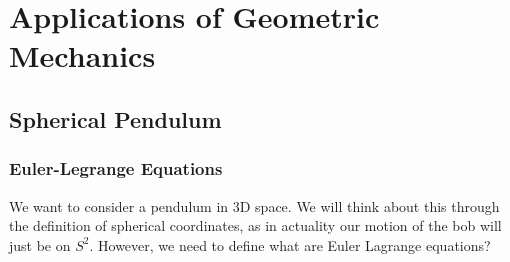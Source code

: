 
\section{Applications of Geometric Mechanics}

\subsection{Spherical Pendulum}

\subsubsection{Euler-Legrange Equations}

We want to consider a pendulum in 3D space. We will think about this through the definition of spherical coordinates, as in actuality our motion of the bob will just be on $S^2$. However, we need to define what are Euler Lagrange equations?\cite{holm_2011}\\

